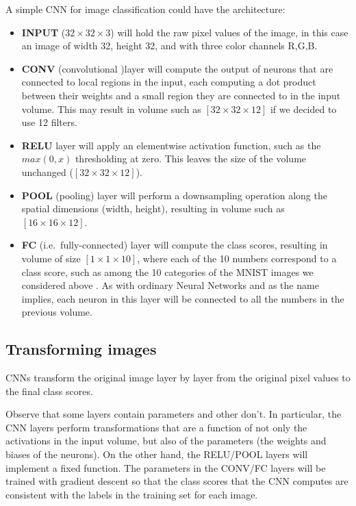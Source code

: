 \documentclass[%
oneside,                 %
final,                   %
10pt]{article}
\begin{document}
A simple CNN for image classification could have the architecture:

\begin{itemize}
\item \textbf{INPUT} ($32\times 32 \times 3$) will hold the raw pixel values of the image, in this case an image of width 32, height 32, and with three color channels R,G,B.

\item \textbf{CONV} (convolutional )layer will compute the output of neurons that are connected to local regions in the input, each computing a dot product between their weights and a small region they are connected to in the input volume. This may result in volume such as $[32\times 32\times 12]$ if we decided to use 12 filters.

\item \textbf{RELU} layer will apply an elementwise activation function, such as the $max(0,x)$ thresholding at zero. This leaves the size of the volume unchanged ($[32\times 32\times 12]$).

\item \textbf{POOL} (pooling) layer will perform a downsampling operation along the spatial dimensions (width, height), resulting in volume such as $[16\times 16\times 12]$.

\item \textbf{FC} (i.e.~fully-connected) layer will compute the class scores, resulting in volume of size $[1\times 1\times 10]$, where each of the 10 numbers correspond to a class score, such as among the 10 categories of the MNIST images we considered above . As with ordinary Neural Networks and as the name implies, each neuron in this layer will be connected to all the numbers in the previous volume.
\end{itemize}

\noindent
\subsection*{Transforming images}

CNNs transform the original image layer by layer from the original
pixel values to the final class scores. 

Observe that some layers contain
parameters and other don’t. In particular, the CNN layers perform
transformations that are a function of not only the activations in the
input volume, but also of the parameters (the weights and biases of
the neurons). On the other hand, the RELU/POOL layers will implement a
fixed function. The parameters in the CONV/FC layers will be trained
with gradient descent so that the class scores that the CNN computes
are consistent with the labels in the training set for each image.
\end{document}
